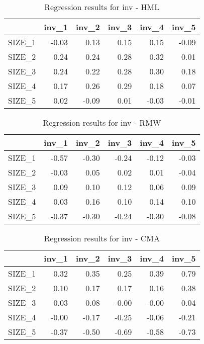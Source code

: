 \begin{table}[ht]
\centering
\caption{Regression results for inv - HML} 
\begin{tabular}{rrrrrr}
  \hline
 & inv\_1 & inv\_2 & inv\_3 & inv\_4 & inv\_5 \\ 
  \hline
SIZE\_1 & -0.03 & 0.13 & 0.15 & 0.15 & -0.09 \\ 
  SIZE\_2 & 0.24 & 0.24 & 0.28 & 0.32 & 0.01 \\ 
  SIZE\_3 & 0.24 & 0.22 & 0.28 & 0.30 & 0.18 \\ 
  SIZE\_4 & 0.17 & 0.26 & 0.29 & 0.18 & 0.07 \\ 
  SIZE\_5 & 0.02 & -0.09 & 0.01 & -0.03 & -0.01 \\ 
   \hline
\end{tabular}
\end{table}


\begin{table}[ht]
\centering
\caption{Regression results for inv - RMW} 
\begin{tabular}{rrrrrr}
  \hline
 & inv\_1 & inv\_2 & inv\_3 & inv\_4 & inv\_5 \\ 
  \hline
SIZE\_1 & -0.57 & -0.30 & -0.24 & -0.12 & -0.03 \\ 
  SIZE\_2 & -0.03 & 0.05 & 0.02 & 0.01 & -0.04 \\ 
  SIZE\_3 & 0.09 & 0.10 & 0.12 & 0.06 & 0.09 \\ 
  SIZE\_4 & 0.03 & 0.16 & 0.10 & 0.14 & 0.10 \\ 
  SIZE\_5 & -0.37 & -0.30 & -0.24 & -0.30 & -0.08 \\ 
   \hline
\end{tabular}
\end{table}


\begin{table}[ht]
\centering
\caption{Regression results for inv - CMA} 
\begin{tabular}{rrrrrr}
  \hline
 & inv\_1 & inv\_2 & inv\_3 & inv\_4 & inv\_5 \\ 
  \hline
SIZE\_1 & 0.32 & 0.35 & 0.25 & 0.39 & 0.79 \\ 
  SIZE\_2 & 0.10 & 0.17 & 0.17 & 0.16 & 0.38 \\ 
  SIZE\_3 & 0.03 & 0.08 & -0.00 & -0.00 & 0.04 \\ 
  SIZE\_4 & -0.00 & -0.17 & -0.25 & -0.06 & -0.21 \\ 
  SIZE\_5 & -0.37 & -0.50 & -0.69 & -0.58 & -0.73 \\ 
   \hline
\end{tabular}
\end{table}


